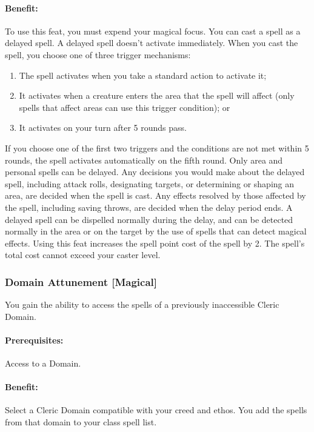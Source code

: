 \paragraph{Benefit:} To use this feat, you must expend your magical focus. 
You can cast a spell as a delayed spell. A delayed spell doesn't activate immediately. 
When you cast the spell, you choose one of three trigger mechanisms: 
\begin{enumerate}
 \item The spell activates when you take a standard action to activate it;
 \item It activates when a creature enters the area that the spell will affect (only spells that affect areas can use this trigger condition); or
 \item It activates on your turn after 5 rounds pass.
\end{enumerate}   
If you choose one of the first two triggers and the conditions are not met within 5 rounds, the spell activates automatically on the fifth round.
Only area and personal spells can be delayed.
Any decisions you would make about the delayed spell, including attack rolls, designating targets, or determining or shaping an area, are decided when the spell is cast. 
Any effects resolved by those affected by the spell, including saving throws, are decided when the delay period ends.
A delayed spell can be dispelled normally during the delay, 
and can be detected normally in the area or on the target by the use of spells that can detect magical effects. 
Using this feat increases the spell point cost of the spell by 2. The spell's total cost cannot exceed your caster level.
\subsubsection[Domain Attunement]{Domain Attunement [Magical]}
\label{Feat:DomainAttunement}
You gain the ability to access the spells of a previously inaccessible Cleric Domain.
\paragraph{Prerequisites:} Access to a Domain.

\paragraph{Benefit:} Select a Cleric Domain compatible with your creed and ethos. You add the spells from that domain to your class spell list.

